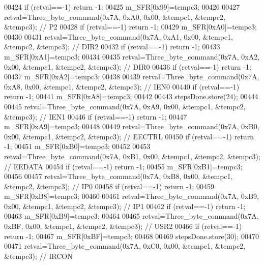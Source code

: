\begin{DoxyCode}
{{00424     \textcolor{keywordflow}{if} (retval==-1) \textcolor{keywordflow}{return} -1;
00425     m\_SFR[0x99]=tempc3;
00426 
00427     retval=Three\_byte\_command(0x7A, 0xA0, 0x00, &tempc1, &tempc2, &tempc3); \textcolor{comment}{// P2}
00428     \textcolor{keywordflow}{if} (retval==-1) \textcolor{keywordflow}{return} -1;
00429     m\_SFR[0xA0]=tempc3;
00430 
00431     retval=Three\_byte\_command(0x7A, 0xA1, 0x00, &tempc1, &tempc2, &tempc3); \textcolor{comment}{// DIR2}
00432     \textcolor{keywordflow}{if} (retval==-1) \textcolor{keywordflow}{return} -1;
00433     m\_SFR[0xA1]=tempc3;
00434 
00435     retval=Three\_byte\_command(0x7A, 0xA2, 0x00, &tempc1, &tempc2, &tempc3); \textcolor{comment}{// DIR0}
00436     \textcolor{keywordflow}{if} (retval==-1) \textcolor{keywordflow}{return} -1;
00437     m\_SFR[0xA2]=tempc3;
00438 
00439     retval=Three\_byte\_command(0x7A, 0xA8, 0x00, &tempc1, &tempc2, &tempc3); \textcolor{comment}{// IEN0}
00440     \textcolor{keywordflow}{if} (retval==-1) \textcolor{keywordflow}{return} -1;
00441     m\_SFR[0xA8]=tempc3;
00442 
00443     stepsDone.store(24);
00444 
00445     retval=Three\_byte\_command(0x7A, 0xA9, 0x00, &tempc1, &tempc2, &tempc3); \textcolor{comment}{// IEN1}
00446     \textcolor{keywordflow}{if} (retval==-1) \textcolor{keywordflow}{return} -1;
00447     m\_SFR[0xA9]=tempc3;
00448 
00449     retval=Three\_byte\_command(0x7A, 0xB0, 0x00, &tempc1, &tempc2, &tempc3); \textcolor{comment}{// EECTRL}
00450     \textcolor{keywordflow}{if} (retval==-1) \textcolor{keywordflow}{return} -1;
00451     m\_SFR[0xB0]=tempc3;
00452 
00453     retval=Three\_byte\_command(0x7A, 0xB1, 0x00, &tempc1, &tempc2, &tempc3); \textcolor{comment}{// EEDATA}
00454     \textcolor{keywordflow}{if} (retval==-1) \textcolor{keywordflow}{return} -1;
00455     m\_SFR[0xB1]=tempc3;
00456 
00457     retval=Three\_byte\_command(0x7A, 0xB8, 0x00, &tempc1, &tempc2, &tempc3); \textcolor{comment}{// IP0}
00458     \textcolor{keywordflow}{if} (retval==-1) \textcolor{keywordflow}{return} -1;
00459     m\_SFR[0xB8]=tempc3;
00460 
00461     retval=Three\_byte\_command(0x7A, 0xB9, 0x00, &tempc1, &tempc2, &tempc3); \textcolor{comment}{// IP1}
00462     \textcolor{keywordflow}{if} (retval==-1) \textcolor{keywordflow}{return} -1;
00463     m\_SFR[0xB9]=tempc3;
00464 
00465     retval=Three\_byte\_command(0x7A, 0xBF, 0x00, &tempc1, &tempc2, &tempc3); \textcolor{comment}{// USR2}
00466     \textcolor{keywordflow}{if} (retval==-1) \textcolor{keywordflow}{return} -1;
00467     m\_SFR[0xBF]=tempc3;
00468 
00469     stepsDone.store(30);
00470 
00471     retval=Three\_byte\_command(0x7A, 0xC0, 0x00, &tempc1, &tempc2, &tempc3); \textcolor{comment}{// IRCON}
}}
\end{DoxyCode}
